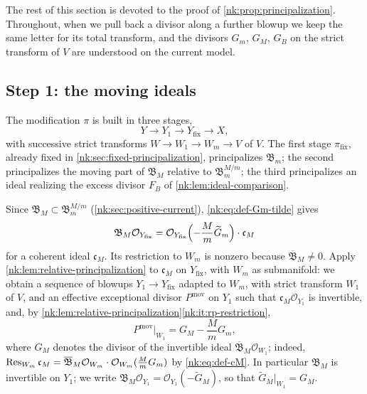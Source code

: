 The rest of this section is devoted to the proof of
\cref{nk:prop:principalization}. Throughout, when we pull back a divisor
along a further blowup we keep the same letter for its total transform,
and the divisors $G_m$, $G_M$, $G_B$ on the strict transform of $V$
are understood on the current model.

\subsection*{Step 1: the moving ideals}

The modification $\pi$ is built in three stages,
\[
  Y\longrightarrow Y_1\longrightarrow Y_{{\mathrm{fix}}}\longrightarrow X,
\]
with successive strict transforms $W\to W_1\to W_m\to V$ of $V$. The
first stage $\pi_{{\mathrm{fix}}}$, already fixed in
\cref{nk:sec:fixed-principalization}, principalizes $\mathfrak B_m$; the second
principalizes the moving part of $\mathfrak B_M$ relative to
$\mathfrak B_m^{M/m}$; the third principalizes an ideal realizing the excess
divisor $F_B$ of \cref{nk:lem:ideal-comparison}.

Since $\mathfrak B_M\subset\mathfrak B_m^{M/m}$ (\cref{nk:sec:positive-current}),
\eqref{nk:eq:def-Gm-tilde} gives
\begin{equation}\label{nk:eq:def-cM}
  \mathfrak B_M\mathcal O_{Y_{{\mathrm{fix}}}}=\mathcal O_{Y_{{\mathrm{fix}}}}\Bigl(-\frac Mm\widetilde G_m\Bigr)\cdot\mathfrak c_M
\end{equation}
for a coherent ideal $\mathfrak c_M$. Its restriction to $W_m$ is
nonzero because $\overline{\mathfrak B}_M\ne0$. Apply
\cref{nk:lem:relative-principalization} to $\mathfrak c_M$ on $Y_{{\mathrm{fix}}}$, with
$W_m$ as submanifold: we obtain a sequence of blowups
$Y_1\to Y_{{\mathrm{fix}}}$ adapted to $W_m$, with strict transform
$W_1$ of $V$, and an effective exceptional divisor $P^{{\mathrm{mov}}}$ on
$Y_1$ such that $\mathfrak c_M\mathcal O_{Y_1}$ is invertible, and, by
\cref{nk:lem:relative-principalization}\ref{nk:it:rp-restriction},
\begin{equation}\label{nk:eq:Pmov-restriction}
  P^{{\mathrm{mov}}}|_{W_1}=G_M-\frac MmG_m ,
\end{equation}
where $G_M$ denotes the divisor of the invertible ideal
$\overline{\mathfrak B}_M\mathcal O_{W_1}$; indeed, $\operatorname{Res}_{W_m}\mathfrak c_M
=\overline{\mathfrak B}_M\mathcal O_{W_m}\cdot\mathcal O_{W_m}(\tfrac MmG_m)$ by \eqref{nk:eq:def-cM}. In
particular $\mathfrak B_M$ is invertible on $Y_1$; we write
$\mathfrak B_M\mathcal O_{Y_1}=\mathcal O_{Y_1}(-\widetilde G_M)$, so that
$\widetilde G_M|_{W_1}=G_M$.

